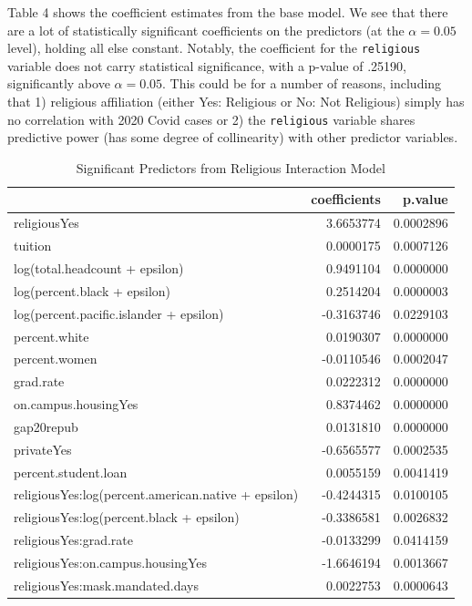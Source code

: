 \documentclass[
]{article}
\begin{document}
Table 4 shows the coefficient estimates from the base model. We see that
there are a lot of statistically significant coefficients on the
predictors (at the \(\alpha=0.05\) level), holding all else constant.
Notably, the coefficient for the \texttt{religious} variable does not
carry statistical significance, with a p-value of .25190, significantly
above \(\alpha = 0.05\). This could be for a number of reasons,
including that 1) religious affiliation (either Yes: Religious or No:
Not Religious) simply has no correlation with 2020 Covid cases or 2) the
\texttt{religious} variable shares predictive power (has some degree of
collinearity) with other predictor variables.

\begin{table}

\caption{\label{tab:unnamed-chunk-19}Significant Predictors from Religious Interaction Model}
\centering
\begin{tabular}[t]{l|r|r}
\hline
  & coefficients & p.value\\
\hline
religiousYes & 3.6653774 & 0.0002896\\
\hline
tuition & 0.0000175 & 0.0007126\\
\hline
log(total.headcount + epsilon) & 0.9491104 & 0.0000000\\
\hline
log(percent.black + epsilon) & 0.2514204 & 0.0000003\\
\hline
log(percent.pacific.islander + epsilon) & -0.3163746 & 0.0229103\\
\hline
percent.white & 0.0190307 & 0.0000000\\
\hline
percent.women & -0.0110546 & 0.0002047\\
\hline
grad.rate & 0.0222312 & 0.0000000\\
\hline
on.campus.housingYes & 0.8374462 & 0.0000000\\
\hline
gap20repub & 0.0131810 & 0.0000000\\
\hline
privateYes & -0.6565577 & 0.0002535\\
\hline
percent.student.loan & 0.0055159 & 0.0041419\\
\hline
religiousYes:log(percent.american.native + epsilon) & -0.4244315 & 0.0100105\\
\hline
religiousYes:log(percent.black + epsilon) & -0.3386581 & 0.0026832\\
\hline
religiousYes:grad.rate & -0.0133299 & 0.0414159\\
\hline
religiousYes:on.campus.housingYes & -1.6646194 & 0.0013667\\
\hline
religiousYes:mask.mandated.days & 0.0022753 & 0.0000643\\
\hline
\end{tabular}
\end{table}
\end{document}
